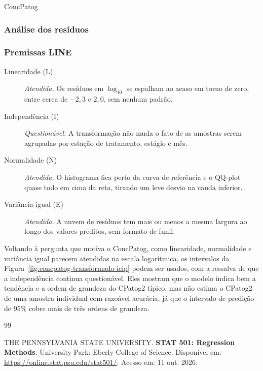 \begin{dataset}{ConcPatog}
\subsubsection{Análise dos resíduos}




\subsubsection{Premissas LINE}

\begin{description}
    \item[Linearidade (L)] \textit{Atendida.} Os resíduos em $\log_{10}$ se espalham ao acaso em torno de zero, entre cerca de $-2{,}3$ e $2{,}0$, sem nenhum padrão.
    \item[Independência (I)] \textit{Questionável.} A transformação não muda o fato de as amostras serem agrupadas por estação de tratamento, estágio e mês.
    \item[Normalidade (N)] \textit{Atendida.} O histograma fica perto da curva de referência e o QQ-plot quase todo em cima da reta, tirando um leve desvio na cauda inferior.
    \item[Variância igual (E)] \textit{Atendida.} A nuvem de resíduos tem mais ou menos a mesma largura ao longo dos valores preditos, sem formato de funil.
\end{description}

Voltando à pergunta que motiva o ConcPatog, como linearidade, normalidade e variância igual parecem atendidas na escala logarítmica, os intervalos da Figura~\ref{fig:concpatog-transformado-icip} podem ser usados, com a ressalva de que a independência continua questionável. Eles mostram que o modelo indica bem a tendência e a ordem de grandeza do CPatog2 típico, mas não estima o CPatog2 de uma amostra individual com razoável acurácia, já que o intervalo de predição de 95\% cobre mais de três ordens de grandeza.

\end{dataset}

\begin{thebibliography}{99}

THE PENNSYLVANIA STATE UNIVERSITY. \textbf{STAT 501: Regression Methods}. University Park: Eberly College of Science. Disponível em: \url{https://online.stat.psu.edu/stat501/}. Acesso em: 11 out. 2026.

\end{thebibliography}

